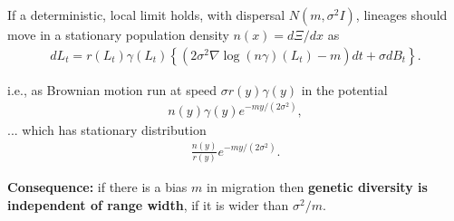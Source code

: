 \documentclass[fontscale=0.38,a0paper]{baposter}
\begin{document}
\begin{poster}
{If a deterministic, local limit holds,
with dispersal $N(m, \sigma^2 I)$,
lineages should move in a stationary population density $n(x) = d\Xi/dx$ as
$$\begin{aligned}
    dL_t = r(L_t) \gamma(L_t) \left\{
            \left(
                2\sigma^2 \nabla \log(n\gamma)(L_t)  - m
            \right) dt
            + \sigma dB_t \right\} .
\end{aligned}$$

i.e., as Brownian motion run at speed $\sigma r(y) \gamma(y)$
in the potential
$$\begin{aligned}
    n(y) \gamma(y) e^{-my/(2\sigma^2)} ,
\end{aligned}$$
... which has stationary distribution
$$\begin{aligned}
    \frac{n(y)}{r(y)} e^{-my/(2\sigma^2)} .
\end{aligned}$$

\textbf{Consequence:} if there is a bias $m$ in migration
then \textbf{genetic diversity is independent of range width},
if it is wider than $\sigma^2 / m$.

}


\end{poster}
\end{document}
